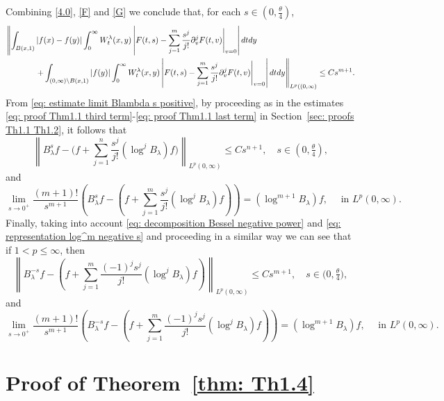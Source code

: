 \documentclass[a4paper,10pt, reqno]{amsart}
\theoremstyle{definition}
\theoremstyle{remark}
\numberwithin{equation}{section}
\begin{document}
Combining \eqref{4.0}, \eqref{F}  and \eqref{G} we conclude that, for each $s\in (0,\tfrac{\theta}{4})$,
\begin{align*}
\left\|\int_{B(x,1)}|f(x)-f(y)|\int_0^\infty W_t^\lambda (x,y)\left|F(t,s)-\sum_{j=1}^m\frac{s^j}{j!}\partial_v^jF(t,v)\Bigg|_{v=0}\right|dtdy\right.&\\
     &\hspace{-10cm}\quad \left.+\int_{(0,\infty)\setminus B(x,1)}|f(y)|\int_0^\infty W_t^\lambda (x,y)\left|F(t,s)-\sum_{j=1}^m\frac{s^j}{j!}\partial_v^jF(t,v)\Bigg|_{v=0}\right|dtdy\right\|_{L^p((0,\infty)}\leq Cs^{m+1}.
\end{align*}
From \eqref{eq: estimate limit Blambda s positive}, by proceeding as in the estimates \eqref{eq: proof Thm1.1 third term}-\eqref{eq: proof Thm1.1 last term}  in Section~\ref{sec: proofs Th1.1 Th1.2}, it follows that
\[
\left\|B_\lambda^sf-\big(f+\sum_{j=1}^n\frac{s^j}{j!}(\log^jB_\lambda)f\big)\right\|_{L^p(0,\infty)}\leq Cs^{n+1},\quad s\in \left(0,\tfrac{\theta}{4}\right),
\]
and
\[
\lim_{s\rightarrow 0^+}\frac{(m+1)!}{s^{m+1}}\left(B_\lambda^sf-\left(f+\sum_{j=1}^m\frac{s^j}{j!}(\log^jB_\lambda)f\right)\right)=(\log^{m+1}B_\lambda)f,\quad \mbox{ in }L^p(0,\infty).
\]
Finally, taking into account \eqref{eq: decomposition Bessel negative power} and \eqref{eq: representation log^m negative s} and proceeding in a similar way we can see that if $1<p\leq \infty$, then
\[
\left\|B_\lambda^{-s}f-\left(f+\sum_{j=1}^m\frac{(-1)^js^j}{j!}(\log^jB_\lambda)f\right)\right\|_{L^p(0,\infty)}\leq Cs^{m+1},\quad s\in \big(0,\tfrac{\theta}{4}\big),
\]
and
\[
\lim_{s\rightarrow 0^+}\frac{(m+1)!}{s^{m+1}}\left(B_\lambda^{-s}f-\left(f+\sum_{j=1}^m\frac{(-1)^js^j}{j!}(\log^jB_\lambda)f\right)\right)=(\log^{m+1}B_\lambda)f,\quad \mbox{ in }L^p(0,\infty).
\]



\section{Proof of Theorem~\ref{thm: Th1.4}}\label{sec: proof Th1.4}
\end{document}
